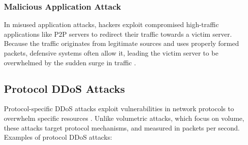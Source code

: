 \documentclass[a4paper, 12pt]{report} %
\begin{document}
        \subsubsection{Malicious Application Attack}
        In misused application attacks, hackers exploit compromised high-traffic applications like P2P servers to redirect their traffic towards a victim server. Because the traffic originates from legitimate sources and uses properly formed packets, defensive systems often allow it, leading the victim server to be overwhelmed by the sudden surge in traffic \cite{impervaDDoSAttack}.


        \subsection{Protocol DDoS Attacks}
        Protocol-specific DDoS attacks exploit vulnerabilities in network protocols to overwhelm specific resources . Unlike volumetric attacks, which focus on volume, these attacks target protocol mechanisms, and  measured in packets per second.
        Examples of protocol DDoS attacks:
\end{document}
